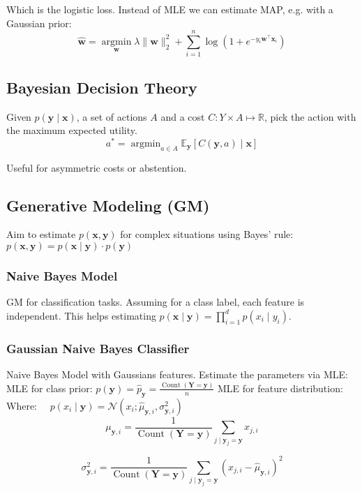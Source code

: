 \documentclass[a4paper,11pt]{article}
\begin{document}
Which is the logistic loss. Instead of MLE we can estimate MAP, e.g. with a Gaussian prior:
$$
\textstyle \hat{\mathbf{w}}=\underset{\mathbf{w}}{\operatorname{argmin}} \lambda\|\mathbf{w}\|_2^2+\sum_{i=1}^n \log \left(1+e^{-y_i \mathbf{w}^{\top} \mathbf{x}_i}\right)
$$

\subsection*{Bayesian Decision Theory}
Given $p(\mathbf{y} \mid \mathbf{x})$, a set of actions $A$ and a cost $C: Y \times A \mapsto \mathbb{R}$, pick the action with the maximum expected utility.
$$
a^*=\operatorname{argmin}_{a \in A} \mathbb{E}_{\mathbf{y}}[C(\mathbf{y}, a) \mid \mathbf{x}]
$$

Useful for asymmetric costs or abstention.
\subsection*{Generative Modeling (GM)}
Aim to estimate $p(\mathbf{x}, \mathbf{y})$ for complex situations using Bayes' rule: $p(\mathbf{x}, \mathbf{y})=p(\mathbf{x} \mid \mathbf{y}) \cdot p(\mathbf{y})$

\subsubsection*{Naive Bayes Model}
GM for classification tasks. Assuming for a class label, each feature is independent. This helps estimating $p(\mathbf{x} \mid \mathbf{y})=\prod_{i=1}^d p\left(x_i \mid y_i\right)$.
\subsubsection*{Gaussian Naive Bayes Classifier}
Naive Bayes Model with Gaussians features. Estimate the parameters via MLE:\\
MLE for class prior: $p(\mathbf{y})=\hat{p}_{\mathbf{y}}=\frac{\operatorname{Count}(\mathbf{Y}=\mathbf{y})}{n}$ MLE for feature distribution:\\
Where: $\quad p\left(x_i \mid \mathbf{y}\right)=\mathcal{N}(x_i ; \hat{\mu}_{\mathbf{y}, i}, \sigma_{\mathbf{y}, i}^2)$
$$
\textstyle \mu_{\mathbf{y}, i}=\frac{1}{\operatorname{Count}(\mathbf{Y}=\mathbf{y})} \sum_{j \mid \mathbf{y}_j=\mathbf{y}} x_{j, i}
$$

$$
\textstyle \sigma_{\mathbf{y}, i}^2=\frac{1}{\operatorname{Count}(\mathbf{Y}=\mathbf{y})} \sum_{j \mid \mathbf{y}_j=\mathbf{y}}\left(x_{j, i}-\hat{\mu}_{\mathbf{y}, i}\right)^2
$$
\end{document}
